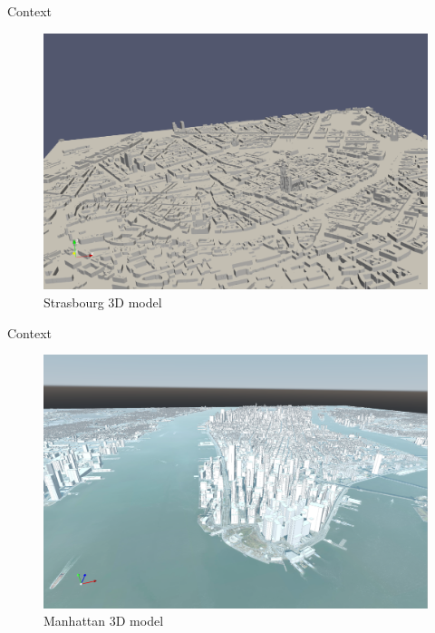 \documentclass[10pt]{beamer}
\begin{document}
\begin{frame}{Context}
\begin{figure}[H]
  \centering
  \includegraphics[width=1\textwidth]{images/stras_mesh.png}
  \caption{Strasbourg 3D model}
\end{figure}

\end{frame}

\begin{frame}{Context}
\begin{figure}[H]
  \centering
  \includegraphics[width=1\textwidth]{images/manhattan_mesh.png}
  \caption{Manhattan 3D model}
\end{figure}

\end{frame}
\end{document}
